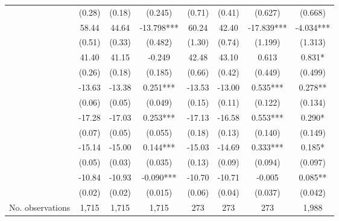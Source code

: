 \begin{table}
\begin{threeparttable}
\begin{tabular}{p{4cm}S@{}S@{}S[round-precision=3]S@{}S@{}S[round-precision=3]S[round-precision=3]}
                                          &      (0.28)&      (0.18)&     (0.245)   &      (0.71)&      (0.41)&     (0.627)   &     (0.668)   \\
            &       58.44&       44.64&     -13.798***&       60.24&       42.40&     -17.839***&      -4.034***\\
                                          &      (0.51)&      (0.33)&     (0.482)   &      (1.30)&      (0.74)&     (1.199)   &     (1.313)   \\
            \midrule
                        &       41.40&       41.15&      -0.249   &       42.48&       43.10&       0.613   &       0.831*  \\
                                          &      (0.26)&      (0.18)&     (0.185)   &      (0.66)&      (0.42)&     (0.449)   &     (0.499)   \\
                &      -13.63&      -13.38&       0.251***&      -13.53&      -13.00&       0.535***&       0.278** \\
                                          &      (0.06)&      (0.05)&     (0.049)   &      (0.15)&      (0.11)&     (0.122)   &     (0.134)   \\
                   &      -17.28&      -17.03&       0.253***&      -17.13&      -16.58&       0.553***&       0.290*  \\
                                          &      (0.07)&      (0.05)&     (0.055)   &      (0.18)&      (0.13)&     (0.140)   &     (0.149)   \\
                          &      -15.14&      -15.00&       0.144***&      -15.03&      -14.69&       0.333***&       0.185*  \\
                                          &      (0.05)&      (0.03)&     (0.035)   &      (0.13)&      (0.09)&     (0.094)   &     (0.097)   \\
                    &      -10.84&      -10.93&      -0.090***&      -10.70&      -10.71&      -0.005   &       0.085** \\
                                          &      (0.02)&      (0.02)&     (0.015)   &      (0.06)&      (0.04)&     (0.037)   &     (0.042)   \\
            \midrule
            No. observations              &       1,715&       1,715&       1,715   &         273&         273&         273   &       1,988   \\

\end{tabular}
\end{threeparttable}
\end{table}
